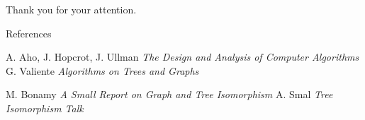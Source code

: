 \documentclass{beamer}
\begin{document}
\begin{frame}
		\begin{center}	
			 Thank you for your attention.
		\end{center} 
\end{frame}
 


\begin{frame}{References}


\begin{thebibliography}{1}
\beamertemplatebookbibitems
{} A. Aho, J. Hopcrot, J. Ullman
			\newblock \emph{The Design and Analysis of Computer Algorithms} 
 G. Valiente
			\newblock\emph{Algorithms on Trees and Graphs}


\beamertemplatearticlebibitems
{} M. Bonamy
			\newblock\emph{A Small Report on Graph and Tree Isomorphism} 
 A. Smal
			\newblock\emph{Tree Isomorphism Talk} 
            
 	
\end{thebibliography}

\end{frame}
\end{document}
